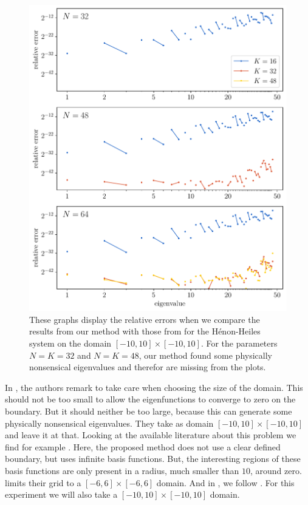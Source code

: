 \begin{figure}
    \begin{center}
        \includegraphics[width=\textwidth]{img/chapter4/nm_test_henon.pdf}
    \end{center}
    \caption{These graphs display the relative errors when we compare the results from our method with those from \cite{wang_new_2009} for the Hénon-Heiles system on the domain $[-10, 10]\times[-10, 10]$. For the parameters $N = K = 32$ and $N = K = 48$, our method found some physically nonsensical eigenvalues and therefor are missing from the plots.}
    \label{fig:c4_nm_henon_test}
\end{figure}

In \cite{wang_new_2009}, the authors remark to take care when choosing the size of the domain. This should not be too small to allow the eigenfunctions to converge to zero on the boundary. But it should neither be too large, because this can generate some physically nonsensical eigenvalues. They take as domain $[-10, 10] \times [-10, 10]$ and leave it at that. Looking at the available literature about this problem we find for example \cite{davis_semiclassical_1979}. Here, the proposed method does not use a clear defined boundary, but uses infinite basis functions. But, the interesting regions of these basis functions are only present in a radius, much smaller than $10$, around zero. \cite{braun_efficient_1996} limits their grid to a $[-6, 6] \times [-6, 6]$ domain. And in \cite{baeyens_improvements_2022}, we follow \cite{braun_efficient_1996}. For this experiment we will also take a $[-10, 10] \times [-10, 10]$ domain.


